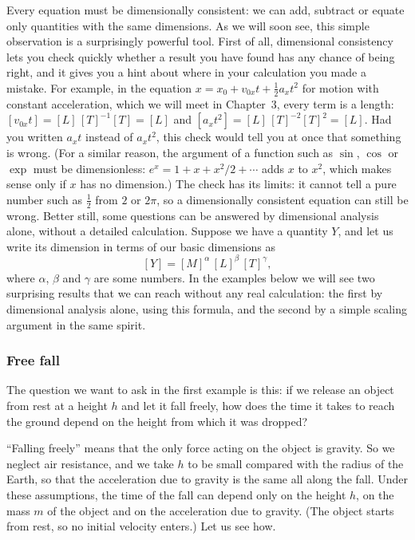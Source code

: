 \documentclass[11pt,a4paper]{article}
\begin{document}
Every equation must be dimensionally consistent: we can add, subtract or equate only quantities
with the same dimensions. As we will soon see, this simple observation is a surprisingly powerful
tool. First of all, dimensional consistency lets you check quickly whether a result you have found
has any chance of being right, and it gives you a hint about where in your calculation you made a
mistake. For example, in the equation $x = x_0 + v_{0x}t + \frac{1}{2}a_xt^2$ for motion with
constant acceleration, which we will meet in Chapter~3, every term is a length:
$[v_{0x}t] = [L]\,[T]^{-1}[T] = [L]$ and $[a_xt^2] = [L]\,[T]^{-2}[T]^2 = [L]$. Had you written
$a_xt$ instead of $a_xt^2$, this check would tell you at once that something is wrong. (For a
similar reason, the argument of a function such as $\sin$, $\cos$ or $\exp$ must be dimensionless:
$e^x = 1 + x + x^2/2 + \cdots$ adds $x$ to $x^2$, which makes sense only if $x$ has no dimension.)
The check has its limits: it cannot tell a pure number such as $\frac{1}{2}$ from $2$ or $2\pi$,
so a dimensionally consistent equation can still be wrong. Better still, some questions can be answered
by dimensional analysis alone, without a detailed calculation. Suppose we have a quantity $Y$, and
let us write its dimension in terms of our basic dimensions as
\begin{equation}\label{eq:Ydim}
  [Y] = [M]^{\alpha}\,[L]^{\beta}\,[T]^{\gamma} ,
\end{equation}
where $\alpha$, $\beta$ and $\gamma$ are some numbers. In the examples below we will see two
surprising results that we can reach without any real calculation: the first by dimensional
analysis alone, using this formula, and the second by a simple scaling argument in the same spirit.

\subsubsection{Free fall}

The question we want to ask in the first example is this: if we release an object from rest at a
height $h$ and let it fall freely, how does the time it takes to reach the ground depend on the
height from which it was dropped?

``Falling freely'' means that the only force acting on the object is gravity. So we neglect air
resistance, and we take $h$ to be small compared with the radius of the Earth, so that the
acceleration due to gravity is the same all along the fall. Under these assumptions, the time of
the fall can depend only on the height $h$, on the mass $m$ of the object and on the acceleration
due to gravity. (The object starts from rest, so no initial velocity enters.) Let us see how.
\end{document}
